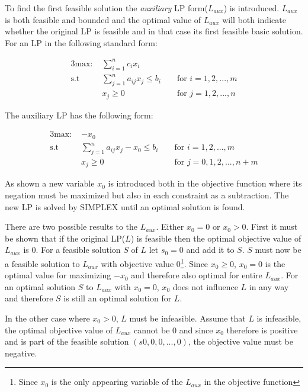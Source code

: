 To find the first feasible solution the \textit{auxiliary} LP form($L_{aux}$) is introduced. $L_{aux}$ is both feasible and bounded and the optimal value of $L_{aux}$ will both indicate whether the original LP is feasible and in that case its first feasible basic solution. For an LP in the following standard form:

\begin{alignat}{3}
\text{max: } &\sum_{i=1}^{n} c_i x_i\\
\text{s.t }  & \sum_{j=1}^{n} a_{ij} x_j \leq b_i  && \text{ for } i=1,2,...,m\\
             & x_j \geq 0                                    && \text{ for } j=1,2,...,n
\end{alignat}

The auxiliary LP has the following form:

\begin{alignat}{3}
\text{max: } & -x_0\\
\text{s.t }  & \sum_{j=1}^{n} a_{ij} x_j -x_0 \leq b_i  && \text{ for } i=1,2,...,m\\
             & x_j \geq 0                                    && \text{ for } j=0,1,2,...,n+m
\end{alignat}

As shown a new variable $x_0$ is introduced both in the objective function where its negation must be maximized but also in each constraint as a subtraction. The new LP is solved by SIMPLEX until an optimal solution is found.

\newpar There are two possible results to the $L_{aux}$. Either $x_0 = 0$ or $x_0 > 0$. First it must be shown that if the original LP($L$) is feasible then the optimal objective value of $L_{aux}$ is $0$. For a feasible solution $S$ of $L$ let $s_0 = 0$ and add it to $S$. $S$ must now be a feasible solution to $L_{aux}$ with objective value $0$\footnote{Since $x_0$ is the only appearing variable of the $L_{aux}$ in the objective function}. Since $x_0 \geq 0$, $x_0 = 0$ is the optimal value for maximizing $-x_0$ and therefore also optimal for entire $L_{aux}$. For an optimal solution $S$ to $L_{aux}$ with $x_0 = 0$, $x_0$ does not influence $L$ in any way and therefore $S$ is still an optimal solution for $L$. 

In the other case where $x_0 > 0$, $L$ must be infeasible. Assume that $L$ is infeasible, the optimal objective value of $L_{aux}$ cannot be $0$ and since $x_0$ therefore is positive and is part of the feasible solution $(s0,0,0,...,0)$, the objective value must be negative.

